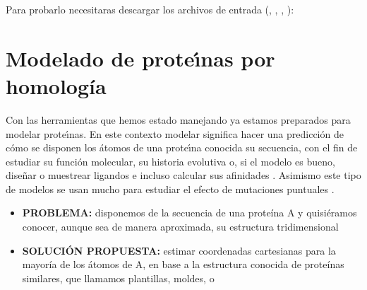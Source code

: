 Para probarlo necesitaras descargar los archivos de entrada
(,
,
,
):

\section{Modelado de prote\'\i{}nas por homolog\'{i}a} \label{CM}

Con las herramientas que hemos estado manejando ya estamos preparados para modelar prote\'\i{}nas. 
En este contexto modelar significa hacer una predicci\'{o}n de c\'{o}mo se disponen los \'{a}tomos 
de una prote\'\i{}na conocida su secuencia, con el fin de estudiar su funci\'{o}n molecular, su historia evolutiva o, 
si el modelo es bueno, dise\~nar o muestrear ligandos e incluso calcular sus afinidades \citep{Singh2010}. 
Asimismo este tipo de modelos se usan mucho para estudiar el efecto de mutaciones puntuales \citep{Kellogg2011}.

\begin{itemize}
\item \textbf{PROBLEMA:} disponemos de la secuencia de una prote\'{i}na A y quisi\'{e}ramos conocer, aunque sea de manera aproximada, 
su estructura tridimensional
\item \textbf{SOLUCI\'{O}N PROPUESTA:} estimar coordenadas cartesianas para la mayor\'{i}a de los \'{a}tomos de A, 
en base a la estructura conocida de prote\'{i}nas  similares, que llamamos plantillas, moldes, o 
\end{itemize}

